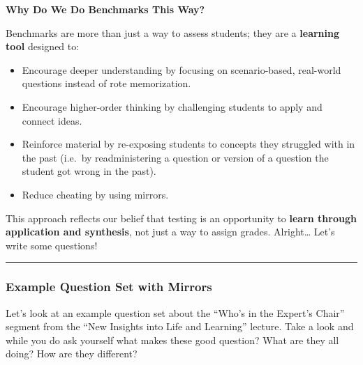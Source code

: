 \documentclass[
]{article}
\providecommand{\tightlist}{%
  \setlength{\itemsep}{0pt}\setlength{\parskip}{0pt}}
\begin{document}
\textbf{Why Do We Do Benchmarks This Way?}

Benchmarks are more than just a way to assess students; they are a \textbf{learning tool} designed to:

\begin{itemize}
\tightlist
\item
  Encourage deeper understanding by focusing on scenario-based, real-world questions instead of rote memorization.
\item
  Encourage higher-order thinking by challenging students to apply and connect ideas.
\item
  Reinforce material by re-exposing students to concepts they struggled with in the past (i.e.~by readministering a question or version of a question the student got wrong in the past).
\item
  Reduce cheating by using mirrors.
\end{itemize}

This approach reflects our belief that testing is an opportunity to \textbf{learn through application and synthesis}, not just a way to assign grades.
Alright\ldots{} Let's write some questions!

\begin{center}\rule{0.5\linewidth}{0.5pt}\end{center}

\hypertarget{example-question-set-with-mirrors}{%
\subsubsection{Example Question Set with Mirrors}\label{example-question-set-with-mirrors}}

Let's look at an example question set about the ``Who's in the Expert's Chair'' segment from the ``New Insights into Life and Learning'' lecture. Take a look and while you do ask yourself what makes these good question? What are they all doing? How are they different?
\end{document}
